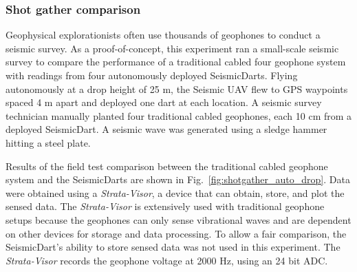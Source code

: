\subsubsection{Shot gather comparison} 
Geophysical explorationists often use thousands of geophones to conduct a seismic survey. 
 As a proof-of-concept, this experiment ran a small-scale seismic survey to compare the performance of a traditional cabled four geophone system with readings from four autonomously deployed SeismicDarts.
Flying autonomously at a drop height of 25 m, the Seismic UAV flew to GPS waypoints spaced 4 m apart and deployed one dart at each location. 
A seismic survey technician manually planted four traditional cabled geophones, each 10 cm from a deployed SeismicDart. 
A seismic wave was generated using a sledge hammer hitting a steel plate.

Results of the field test comparison between the traditional cabled geophone system and the SeismicDarts are shown in Fig.~\ref{fig:shotgather_auto_drop}.   
Data were obtained using a \emph{Strata-Visor}, a device that can obtain, store, and plot the sensed data. 
The \emph{Strata-Visor} is extensively used with traditional geophone setups because the geophones can only sense vibrational waves and are dependent on other devices for storage and data processing. 
To allow a fair comparison, the SeismicDart's  ability to store sensed data was not used in this experiment. 
 The \emph{Strata-Visor} records the geophone voltage at 2000 Hz, using an 24 bit ADC.

